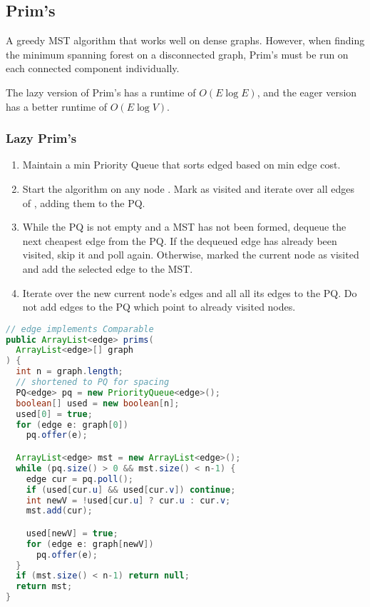 



\subsection*{Prim's}

A greedy MST algorithm that works well on dense graphs.
However, when finding the minimum spanning forest on a disconnected graph,
Prim's must be run on each connected component individually.

The lazy version of Prim's has a runtime of $O(E\log E)$, and the eager version
has a better runtime of $O(E\log V)$.

\subsubsection*{Lazy Prim's}

\begin{enumerate}
    \item Maintain a min Priority Queue that sorts edged based on min edge cost.
    \item Start the algorithm on any node . Mark  as visited and iterate
        over all edges of , adding them to the PQ.
    \item While the PQ is not empty and a MST has not been formed, dequeue the next cheapest
        edge from the PQ.
        If the dequeued edge has already been visited, skip it and poll again.
        Otherwise, marked the current node as visited and add the selected edge to the MST.
    \item Iterate over the new current node's edges and all all its edges to the PQ.
        Do not add edges to the PQ which point to already visited nodes.
\end{enumerate}

\begin{lstlisting}[language=Java,basicstyle=\tiny]
// edge implements Comparable
public ArrayList<edge> prims(
  ArrayList<edge>[] graph
) {
  int n = graph.length;
  // shortened to PQ for spacing
  PQ<edge> pq = new PriorityQueue<edge>();
  boolean[] used = new boolean[n];
  used[0] = true;
  for (edge e: graph[0])
    pq.offer(e);

  ArrayList<edge> mst = new ArrayList<edge>();
  while (pq.size() > 0 && mst.size() < n-1) {
    edge cur = pq.poll();
    if (used[cur.u] && used[cur.v]) continue;
    int newV = !used[cur.u] ? cur.u : cur.v;
    mst.add(cur);

    used[newV] = true;
    for (edge e: graph[newV])
      pq.offer(e);
  }
  if (mst.size() < n-1) return null;
  return mst;
}
\end{lstlisting}

